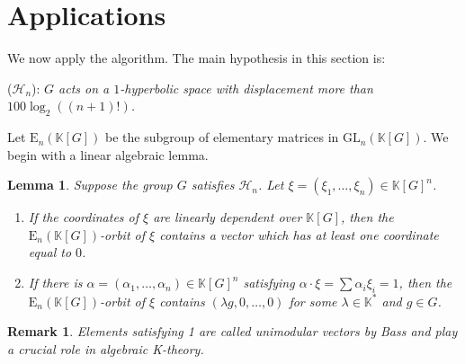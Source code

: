 \documentclass[11pt,letterpaper]{amsart}
\newtheorem{lemma}[theorem]{Lemma}
\newtheorem*{remark}{Remark}
\begin{document}
\section{Applications}
We now apply the algorithm. %
The main hypothesis in this section is:

\vspace{0.4cm}

\noindent ($\mathcal{H}_{n}$):\hspace{0.1cm} {\it $G$ acts on a $1$-hyperbolic space with displacement more than $100\log_2((n+1)!)$.}

\vspace{0.4cm}

\noindent
Let $\mathrm{E}_n (\mathbb{K} [G])$ be the subgroup of elementary matrices in $\mathrm{GL}_n
(\mathbb{K} [G])$. We begin with a linear algebraic lemma. %


\begin{lemma}
\label{elementary}
Suppose the group $G$ satisfies $\mathcal H_{n}$. 
Let $\xi=(\xi_1,\dots,\xi_n)\in\mathbb K[G]^n$.
\begin{enumerate}
\item[0.]
If the coordinates of $\xi$ are linearly dependent over $\mathbb K[G]$, then the $\mathrm{E}_n(\mathbb K[G])$-orbit of $\xi$ contains a vector which has at least one coordinate equal to $0$. 
\item[1.]
If there is $\alpha=(\alpha_1,\dots,\alpha_n)\in\mathbb K[G]^n$ satisfying $\alpha\cdot\xi=\sum\alpha_i\xi_i=1$, then the $\mathrm{E}_n(\mathbb K[G])$-orbit of $\xi$ contains $(\lambda g,0,\dots,0)$ for some $\lambda\in\mathbb K^*$ and $g\in G$. 
\end{enumerate}
\end{lemma}

\begin{remark}
Elements satisfying 1 are called unimodular vectors by Bass and play a crucial role in algebraic K-theory. 
\end{remark}
\end{document}
